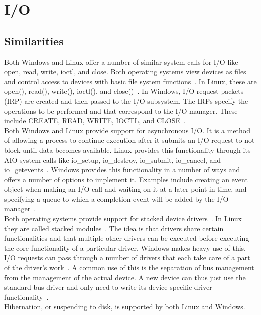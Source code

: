 \documentclass[letterpaper,10pt,titlepage]{article}
\begin{document}
\section{I/O}
\subsection{Similarities}
Both Windows and Linux offer a number of similar system calls for I/O like 
open, read, write, ioctl, and close. Both operating systems view devices as 
files and control access to devices with basic file system functions~\cite{msdn-io}. In 
Linux, these are open(), read(), write(), ioctl(), and close()~\cite{love14}. In Windows, 
I/O request packets (IRP) are created and then passed to the I/O subsystem. 
The IRPs specify the operations to be performed and that correspond to the 
I/O manager. These include CREATE, READ, WRITE, IOCTL, and CLOSE~\cite{tm11}.
\\
\linebreak
Both Windows and Linux provide support for asynchronous I/O. It is a method of
allowing a process to continue execution after it submits an I/O request to 
not block until data becomes available. Linux provides this functionality 
through its AIO system calls like io\_setup, io\_destroy, io\_submit,
io\_cancel, and io\_getevents~\cite{aio}. Windows provides this functionality in a number
of ways and offers a number of options to implement it. Examples include 
creating an event object when making an I/O call and waiting on it at a later 
point in time, and specifying a queue to which a completion event will be 
added by the I/O manager~\cite{tm11}.
\\
\linebreak
Both operating systems provide support for stacked device drivers~\cite{tm11}. In Linux
they are called stacked modules~\cite{tm10}. The idea is that drivers share certain 
functionalities and that multiple other drivers can be executed before 
executing the core functionality of a particular driver. Windows makes heavy 
use of this. I/O requests can pass through a number of drivers that each take 
care of a part of the driver's work~\cite{tm11}. A common use of this is the separation of
bus management from the management of the actual device. A new device can 
thus just use the standard bus driver and only need to write its device 
specific driver functionality~\cite{rsw9}.
\\
\linebreak
Hibernation, or suspending to disk, is supported by both Linux and Windows.
\end{document}
